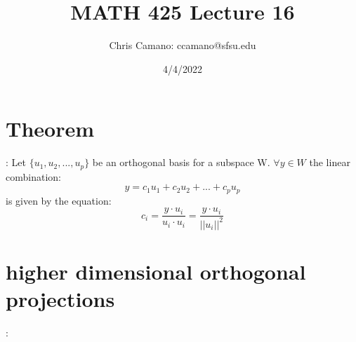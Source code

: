 \documentclass[12pt]{article}
\author{Chris Camano: ccamano@sfsu.edu}
\title{MATH 425  Lecture 16 }
\date{4/4/2022}
\newcommand{\sect}[1]{\section*{#1}}
\begin{document}
\maketitle

\sect{Theorem}:
Let $\{u_1,u_2,...,u_p\}$ be an orthogonal basis for a subspace W. $\forall y \in W$ the linear combination:
\[
  y=c_1u_1+c_2u_2+...+c_pu_p
\]
is given by the equation:
\[
  c_i=\frac{y \cdot u_i}{u_i \cdot u_i}=\frac{y \cdot u_i}{||u_i||^2}
\]
\sect{higher dimensional orthogonal projections}:
\end{document}
